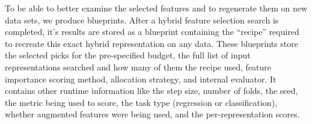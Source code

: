 
To be able to better examine the selected features and to regenerate them on new data sets, we produce blueprints. After a hybrid feature selection search is completed, it's results are stored as a blueprint containing the ``recipe'' required to recreate this exact hybrid representation on any data. These blueprints store the selected picks for the pre-specified budget,  the full list of input representations searched and how many of them the recipe used, feature importance scoring method, allocation strategy, and internal evaluator. It contains other runtime information like the step size, number of folds, the seed, the metric being used to score, the task type (regression or classification), whether augmented features were being used, and the per-representation scores.

